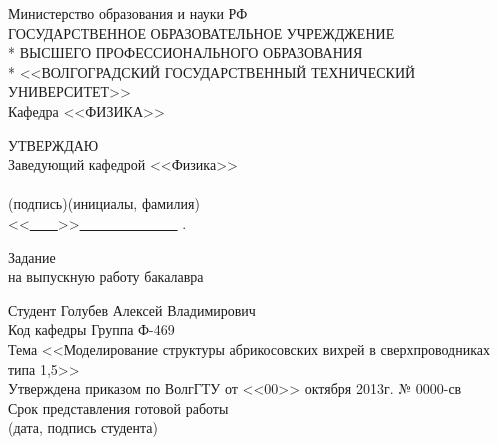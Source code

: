 \begin{titlepage}
	\begin{center}
		Министерство образования и науки РФ \\
		\vspace{.5cm}
		ГОСУДАРСТВЕННОЕ ОБРАЗОВАТЕЛЬНОЕ УЧРЕЖДЖЕНИЕ\\*
		ВЫСШЕГО ПРОФЕССИОНАЛЬНОГО ОБРАЗОВАНИЯ\\*
		<<ВОЛГОГРАДСКИЙ ГОСУДАРСТВЕННЫЙ ТЕХНИЧЕСКИЙ УНИВЕРСИТЕТ>>\\
		\vspace{.5cm}
		Кафедра <<ФИЗИКА>>
		\vspace{.5cm}
	\end{center}
	\begin{flushright}
		УТВЕРЖДАЮ\\
		Заведующий кафедрой <<Физика>>\\
		\vspace{.3cm}
		\underline{\hspace{2cm}}\hspace{1cm}\underline{\hspace{4cm}}\\
		\vspace{-.2cm}\footnotesize(подпись)\hspace{1.8cm}(инициалы, фамилия)
			\hspace*{.2cm}\ \normalsize\\
		\vspace{.3cm}
		<<\underline{\ \ \ \ }>>\underline{\ \ \ \ \ \ \ \ \ \ \ \ \ \ } 
			\the{}.
	\end{flushright}
	\begin{center}
		\large Задание \\
		\normalsize на выпускную работу бакалавра
	\end{center}
	\begin{flushleft}
		Студент Голубев Алексей Владимирович\\
		Код кафедры \underline{\hspace{3cm}}\hspace{6cm}Группа Ф-469\\
		Тема <<Моделирование структуры абрикосовских вихрей в сверхпроводниках 
		    типа 1,5>>\\
		Утверждена приказом по ВолгГТУ от <<00>> октября 2013г. № 0000-св\\
		Срок представления готовой работы \underline{\hspace{6cm}}\\
		\vspace{-.2cm}\hspace{9.5cm}\footnotesize(дата, подпись студента)

\end{flushleft}
\end{titlepage}
